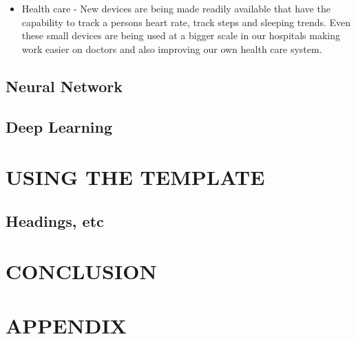 \documentclass[letterpaper, 10 pt, conference]{ieeeconf}  %
\begin{document}
\begin{itemize}
\item Health care - New devices are being made readily available that have the capability  to track a persons heart rate, track steps and sleeping trends. Even these small devices are being used at a bigger scale in our hospitals making work easier on doctors and also improving our own health care system.
\end{itemize}



\subsection{Neural Network}

\subsection{Deep Learning}



\section{USING THE TEMPLATE}

\subsection{Headings, etc}

 
\section{CONCLUSION}



\addtolength{\textheight}{-12cm}   %

\section*{APPENDIX}
\end{document}
